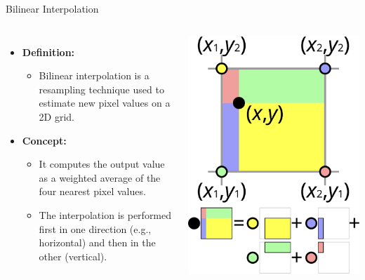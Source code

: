 \documentclass{beamer}
\begin{document}
\begin{frame}{Bilinear Interpolation}
  \begin{columns}[T]
    \vspace{1em}
    \begin{itemize}
      \item \textbf{Definition:}  
      \begin{itemize}
          \item Bilinear interpolation is a resampling technique used to estimate new pixel values on a 2D grid.
      \end{itemize}

      \item \textbf{Concept:}
      \begin{itemize}
          \item It computes the output value as a weighted average of the four nearest pixel values.
          \item The interpolation is performed first in one direction (e.g., horizontal) and then in the other (vertical).
      \end{itemize}
    \end{itemize}

      \vspace{-2.5em}
      \centering
      \includegraphics[width=0.65\linewidth]{../Media/bilinear.png}
  \end{columns}
\end{frame}
\end{document}
